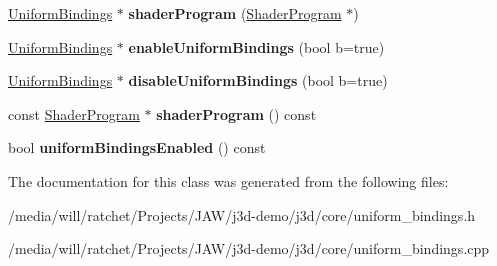\begin{DoxyCompactItemize}
\item 
\hypertarget{classj3d_1_1core_1_1UniformBindings_a6aa27b04b2c550310ab0428522b543f6}{}\hyperlink{classj3d_1_1core_1_1UniformBindings}{Uniform\+Bindings} $\ast$ {\bfseries shader\+Program} (\hyperlink{classj3d_1_1ShaderProgram}{Shader\+Program} $\ast$)\label{classj3d_1_1core_1_1UniformBindings_a6aa27b04b2c550310ab0428522b543f6}

\item 
\hypertarget{classj3d_1_1core_1_1UniformBindings_a5a4037d01d24dfb2bd60fae197053453}{}\hyperlink{classj3d_1_1core_1_1UniformBindings}{Uniform\+Bindings} $\ast$ {\bfseries enable\+Uniform\+Bindings} (bool b=true)\label{classj3d_1_1core_1_1UniformBindings_a5a4037d01d24dfb2bd60fae197053453}

\item 
\hypertarget{classj3d_1_1core_1_1UniformBindings_ac600f553d2772460ad40534367f80717}{}\hyperlink{classj3d_1_1core_1_1UniformBindings}{Uniform\+Bindings} $\ast$ {\bfseries disable\+Uniform\+Bindings} (bool b=true)\label{classj3d_1_1core_1_1UniformBindings_ac600f553d2772460ad40534367f80717}

\item 
\hypertarget{classj3d_1_1core_1_1UniformBindings_a021710144a95200bffaa8b8b3bc7cd87}{}const \hyperlink{classj3d_1_1ShaderProgram}{Shader\+Program} $\ast$ {\bfseries shader\+Program} () const \label{classj3d_1_1core_1_1UniformBindings_a021710144a95200bffaa8b8b3bc7cd87}

\item 
\hypertarget{classj3d_1_1core_1_1UniformBindings_aae9a9e52903b16fb51a1cc50b8286d36}{}bool {\bfseries uniform\+Bindings\+Enabled} () const \label{classj3d_1_1core_1_1UniformBindings_aae9a9e52903b16fb51a1cc50b8286d36}

\end{DoxyCompactItemize}


The documentation for this class was generated from the following files\+:\begin{DoxyCompactItemize}
\item 
/media/will/ratchet/\+Projects/\+J\+A\+W/j3d-\/demo/j3d/core/uniform\+\_\+bindings.\+h\item 
/media/will/ratchet/\+Projects/\+J\+A\+W/j3d-\/demo/j3d/core/uniform\+\_\+bindings.\+cpp\end{DoxyCompactItemize}
